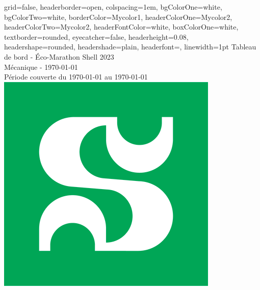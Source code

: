 \documentclass[a0paper,portrait]{baposter}
\begin{document}

\begin{poster}
{
grid=false,
headerborder=open, %
colspacing=1em, %
bgColorOne=white, %
bgColorTwo=white, %
borderColor=Mycolor1, %
headerColorOne=Mycolor2, %
headerColorTwo=Mycolor2, %
headerFontColor=white, %
boxColorOne=white, %
textborder=rounded, %
eyecatcher=false, %
headerheight=0.08\textheight, %
headershape=rounded, %
headershade=plain,
headerfont=\Large\textsf, %
linewidth=1pt %
}
{}
%
%
{\textsf{{Tableau de bord - Éco-Marathon Shell 2023}}} %
{\sf\vspace{0.1em}\\
Mécanique  -  {\AdvanceDate[0]\today} 
\vspace{0.1em}\\
\small{ Période couverte du {\AdvanceDate[-7]\today} au {\AdvanceDate[0]\today}
}
}
{\includegraphics[width=.1\linewidth]{img/udes.png}} %

\end{poster}
\end{document}
